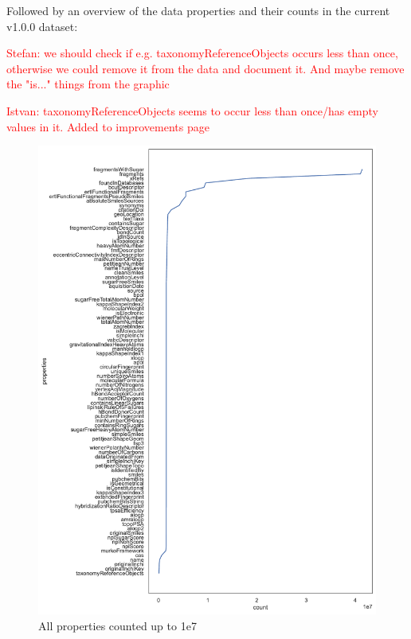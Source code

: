\documentclass[
]{ceurart}
\begin{document}
Followed by an overview of the data properties and their counts in the current v1.0.0 dataset:


\textcolor{red}{Stefan: we should check if e.g. taxonomyReferenceObjects occurs less than once, otherwise we could remove it from the data and document it. And maybe remove the "is..." things from the graphic}

\textcolor{red}{Istvan: taxonomyReferenceObjects seems to occur less than once/has empty values in it. Added to improvements page}

\begin{figure}
    \centering
    \includegraphics[width=\textwidth]{properties_plot_v1.0.0.pdf}
    \caption{All properties counted up to 1e7}
    \label{fig:propertiescount}
\end{figure}
\end{document}
